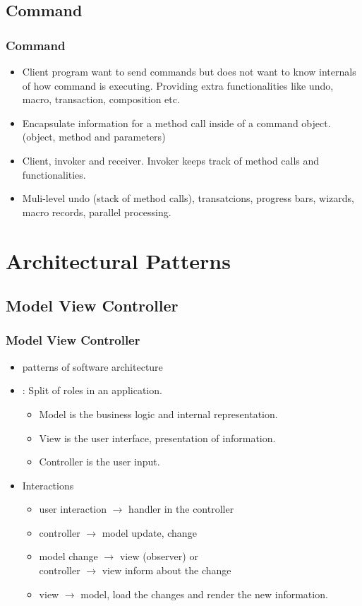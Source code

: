 \documentclass[trans,compress,xcolor=table]{beamer}
\begin{document}
\subsection{Command}
\begin{frame}
\frametitle{Command}
\begin{itemize}
\item {} Client program want to send commands but
does not want to know internals of how command is executing.
Providing extra functionalities like undo, macro, transaction,
composition etc.
\item {} Encapsulate information for a method call
	inside of a command object.
	(object, method and parameters)
\item Client, invoker and receiver. Invoker keeps track of method calls
	and functionalities.
\item Muli-level undo (stack of method calls), transatcions, progress
	bars, wizards, macro records, parallel processing.
\end{itemize}
\end{frame}

\section{Architectural Patterns}
\subsection{Model View Controller}
\begin{frame}
\frametitle{Model View Controller}
\begin{itemize}
\item {} patterns of software architecture
\item {}: Split of roles in an
	application.
	\begin{itemize}
	\item  Model is the business logic and internal representation.
	\item View is the user interface,  presentation of information.
	\item Controller is the user input.
	\end{itemize}
\item Interactions
	\begin{itemize}
	\item user interaction $\rightarrow$ handler in the controller
	\item controller $\rightarrow$ model update, change
	\item model change $\rightarrow$ view  (observer) or \\
		controller $\rightarrow$ view  inform about the change
	\item view $\rightarrow$ model, load the changes and render
		the new information.
	\end{itemize}
\end{itemize}
\end{frame}
\end{document}
